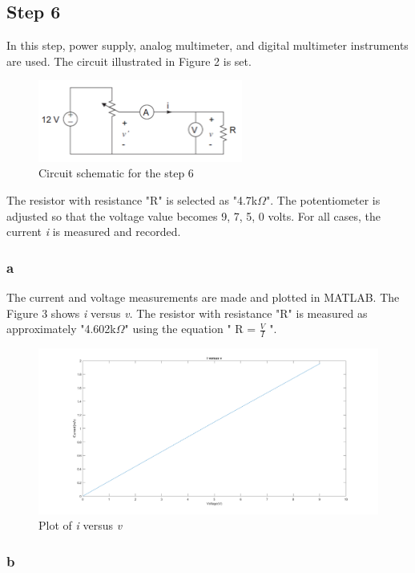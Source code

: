 \documentclass[letterpaper,12pt]{article}
\begin{document}
\subsection{Step 6}
In this step, power supply, analog multimeter, and digital multimeter instruments are used. The circuit illustrated in Figure 2 is set. 
\begin{figure}[H]
	\centering
	\includegraphics[width=0.6\textwidth]{6.png}
	\caption{Circuit schematic for the step 6}
\end{figure} 

The resistor with resistance "R" is selected as "4.7k\(\Omega\)". The potentiometer is adjusted so that the voltage value becomes 9, 7, 5, 0 volts. For all cases, the current \emph{i} is measured and recorded.

\subsubsection{a}
The current and voltage measurements are made and plotted in MATLAB. The Figure 3 shows  \emph{i} versus \emph{v}. The resistor with resistance "R" is measured as approximately "4.602k\(\Omega\)" using the equation " R  = \(\frac{V}{I}\) ".

\begin{figure}[H]
	\centering
	\includegraphics[width=1\textwidth]{6a.png}
	\caption{Plot of \emph{i} versus \emph{v}}
\end{figure} 


\subsubsection{b}
\end{document}
